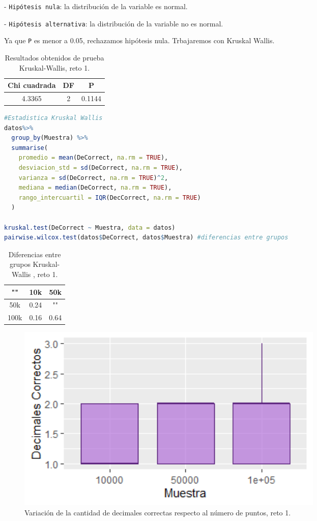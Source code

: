 \documentclass{article}
\begin{document}
- \texttt{Hip\'otesis nula}: la distribuci\'on de la variable es normal.

- \texttt{Hip\'otesis alternativa}: la distribuci\'on de la variable no es normal.

Ya que \texttt{P} es menor a 0.05, rechazamos hip\'otesis nula. Trbajaremos con Kruskal Wallis.

\begin{table}[ht]
    \centering
    \caption{Resultados obtenidos de prueba Kruskal-Wallis, reto 1.} 
    \begin{tabular}{|c|c|c|}
    \hline
    Chi cuadrada & DF & P  \\
    \hline
    4.3365 & 2 & 0.1144 \\
    \hline
\end{tabular}
    \label{cuadro 5}
\end{table}

\begin{lstlisting}[language=R, caption= C\'odigo prueba estad\'istica Kruskal-Wallis.]
#Estadistica Kruskal Wallis
datos%>%
  group_by(Muestra) %>%
  summarise(
    promedio = mean(DeCorrect, na.rm = TRUE),
    desviacion_std = sd(DeCorrect, na.rm = TRUE),
    varianza = sd(DeCorrect, na.rm = TRUE)^2,
    mediana = median(DeCorrect, na.rm = TRUE),
    rango_intercuartil = IQR(DecCorrect, na.rm = TRUE)
  )

kruskal.test(DeCorrect ~ Muestra, data = datos)
pairwise.wilcox.test(datos$DeCorrect, datos$Muestra) #diferencias entre grupos
\end{lstlisting}

\begin{table}[ht]
    \centering
    \caption{Diferencias entre grupos Kruskal-Wallis , reto 1.} 
    \begin{tabular}{|c|c|c|}
    \hline
    "" & 10k & 50k  \\
    \hline
    50k & 0.24 & "" \\
    \hline
    100k & 0.16 & 0.64  \\
    \hline
\end{tabular}
    \label{cuadro 7}
\end{table}


\begin{figure}[h!] %
    \centering
    \includegraphics[width=150mm]{boxplotreto1.png} %
    \caption{Variaci\'on de la cantidad de decimales correctas respecto al n\'umero de puntos, reto 1.}
    \label{Figura 2}
\end{figure}
\end{document}
